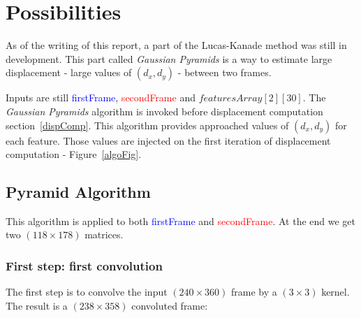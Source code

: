 
\section{Possibilities}

As of the writing of this report, a part of the Lucas-Kanade method was still in development. This part called \emph{Gaussian Pyramids} is a way to estimate large displacement - large values of $(d_{x},d_{y})$ - between two frames.

Inputs are still \textcolor{blue}{firstFrame}, \textcolor{red}{secondFrame} and  $featuresArray[2][30]$. The \emph{Gaussian Pyramids} algorithm is invoked before displacement computation section~\ref{dispComp}. This algorithm provides approached values of $(d_{x},d_{y})$ for each feature. Those values are injected on the first iteration of displacement computation - Figure~\ref{algoFig}.

\subsection{Pyramid Algorithm}

This algorithm is applied to both \textcolor{blue}{firstFrame} and \textcolor{red}{secondFrame}. At the end we get two $(118\times 178)$ matrices.


\subsubsection{First step: first convolution}

The first step is to convolve the input $(240\times 360)$ frame by a $(3\times 3)$ kernel. The result is a $(238\times 358)$ convoluted frame:

